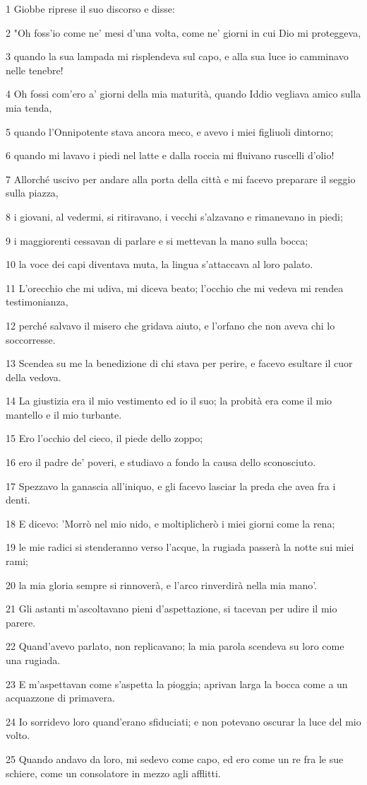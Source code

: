 \par 1 Giobbe riprese il suo discorso e disse:
\par 2 "Oh foss'io come ne' mesi d'una volta, come ne' giorni in cui Dio mi proteggeva,
\par 3 quando la sua lampada mi risplendeva sul capo, e alla sua luce io camminavo nelle tenebre!
\par 4 Oh fossi com'ero a' giorni della mia maturità, quando Iddio vegliava amico sulla mia tenda,
\par 5 quando l'Onnipotente stava ancora meco, e avevo i miei figliuoli dintorno;
\par 6 quando mi lavavo i piedi nel latte e dalla roccia mi fluivano ruscelli d'olio!
\par 7 Allorché uscivo per andare alla porta della città e mi facevo preparare il seggio sulla piazza,
\par 8 i giovani, al vedermi, si ritiravano, i vecchi s'alzavano e rimanevano in piedi;
\par 9 i maggiorenti cessavan di parlare e si mettevan la mano sulla bocca;
\par 10 la voce dei capi diventava muta, la lingua s'attaccava al loro palato.
\par 11 L'orecchio che mi udiva, mi diceva beato; l'occhio che mi vedeva mi rendea testimonianza,
\par 12 perché salvavo il misero che gridava aiuto, e l'orfano che non aveva chi lo soccorresse.
\par 13 Scendea su me la benedizione di chi stava per perire, e facevo esultare il cuor della vedova.
\par 14 La giustizia era il mio vestimento ed io il suo; la probità era come il mio mantello e il mio turbante.
\par 15 Ero l'occhio del cieco, il piede dello zoppo;
\par 16 ero il padre de' poveri, e studiavo a fondo la causa dello sconosciuto.
\par 17 Spezzavo la ganascia all'iniquo, e gli facevo lasciar la preda che avea fra i denti.
\par 18 E dicevo: 'Morrò nel mio nido, e moltiplicherò i miei giorni come la rena;
\par 19 le mie radici si stenderanno verso l'acque, la rugiada passerà la notte sui miei rami;
\par 20 la mia gloria sempre si rinnoverà, e l'arco rinverdirà nella mia mano'.
\par 21 Gli astanti m'ascoltavano pieni d'aspettazione, si tacevan per udire il mio parere.
\par 22 Quand'avevo parlato, non replicavano; la mia parola scendeva su loro come una rugiada.
\par 23 E m'aspettavan come s'aspetta la pioggia; aprivan larga la bocca come a un acquazzone di primavera.
\par 24 Io sorridevo loro quand'erano sfiduciati; e non potevano oscurar la luce del mio volto.
\par 25 Quando andavo da loro, mi sedevo come capo, ed ero come un re fra le sue schiere, come un consolatore in mezzo agli afflitti.

